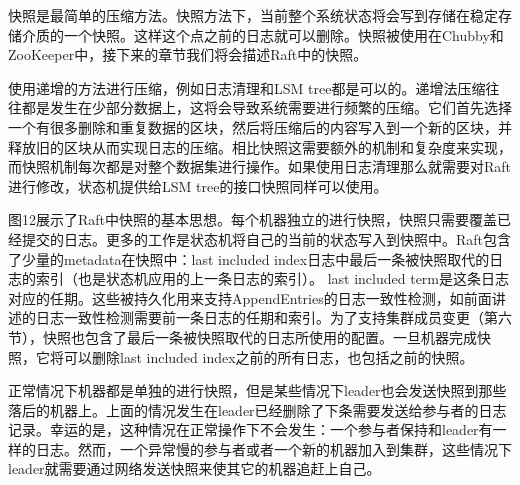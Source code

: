 \documentclass[journal]{IEEEtran}
\begin{document}
快照是最简单的压缩方法。快照方法下，当前整个系统状态将会写到存储在稳定存储介质的一个快照。这样这个点之前的日志就可以删除。快照被使用在Chubby和ZooKeeper中，接下来的章节我们将会描述Raft中的快照。

使用递增的方法进行压缩，例如日志清理和LSM tree都是可以的。递增法压缩往往都是发生在少部分数据上，这将会导致系统需要进行频繁的压缩。它们首先选择一个有很多删除和重复数据的区块，然后将压缩后的内容写入到一个新的区块，并释放旧的区块从而实现日志的压缩。相比快照这需要额外的机制和复杂度来实现，而快照机制每次都是对整个数据集进行操作。如果使用日志清理那么就需要对Raft进行修改，状态机提供给LSM tree的接口快照同样可以使用。

图12展示了Raft中快照的基本思想。每个机器独立的进行快照，快照只需要覆盖已经提交的日志。更多的工作是状态机将自己的当前的状态写入到快照中。Raft包含了少量的metadata在快照中：last included index日志中最后一条被快照取代的日志的索引（也是状态机应用的上一条日志的索引）。 last included term是这条日志对应的任期。这些被持久化用来支持AppendEntries的日志一致性检测，如前面讲述的日志一致性检测需要前一条日志的任期和索引。为了支持集群成员变更（第六节），快照也包含了最后一条被快照取代的日志所使用的配置。一旦机器完成快照，它将可以删除last included index之前的所有日志，也包括之前的快照。


正常情况下机器都是单独的进行快照，但是某些情况下leader也会发送快照到那些落后的机器上。上面的情况发生在leader已经删除了下条需要发送给参与者的日志记录。幸运的是，这种情况在正常操作下不会发生：一个参与者保持和leader有一样的日志。然而，一个异常慢的参与者或者一个新的机器加入到集群，这些情况下leader就需要通过网络发送快照来使其它的机器追赶上自己。
\end{document}
